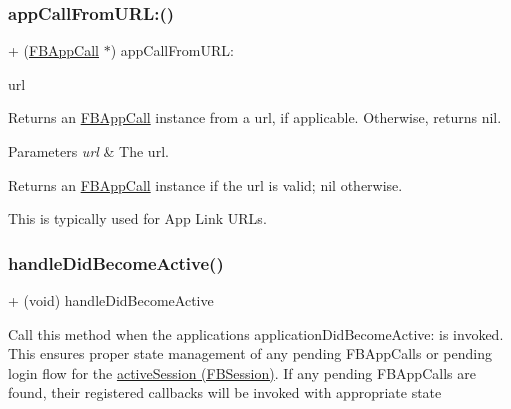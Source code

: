\subsubsection{\texorpdfstring{app\+Call\+From\+U\+R\+L\+:()}{appCallFromURL:()}\hspace{0.1cm}{\footnotesize\ttfamily [5/5]}}
{\footnotesize\ttfamily + (\hyperlink{interfaceFBAppCall}{F\+B\+App\+Call} $\ast$) app\+Call\+From\+U\+R\+L\+: \begin{DoxyParamCaption}\item[{(N\+S\+U\+RL $\ast$)}]{url }\end{DoxyParamCaption}}

Returns an \hyperlink{interfaceFBAppCall}{F\+B\+App\+Call} instance from a url, if applicable. Otherwise, returns nil.


\begin{DoxyParams}{Parameters}
{\em url} & The url.\\
\hline
\end{DoxyParams}
\begin{DoxyReturn}{Returns}
an \hyperlink{interfaceFBAppCall}{F\+B\+App\+Call} instance if the url is valid; nil otherwise.
\end{DoxyReturn}
This is typically used for App Link U\+R\+Ls. \mbox{\label{interfaceFBAppCall_ae38f6595e03e0ba2c44670e7ff579a70}} 
\subsubsection{\texorpdfstring{handle\+Did\+Become\+Active()}{handleDidBecomeActive()}\hspace{0.1cm}{\footnotesize\ttfamily [1/5]}}
{\footnotesize\ttfamily + (void) handle\+Did\+Become\+Active \begin{DoxyParamCaption}{ }\end{DoxyParamCaption}}

Call this method when the application\textquotesingle{}s application\+Did\+Become\+Active\+: is invoked. This ensures proper state management of any pending F\+B\+App\+Calls or pending login flow for the \hyperlink{interfaceFBSession_aaf6863ab39e2f67733792453874d3870}{active\+Session (\+F\+B\+Session)}. If any pending F\+B\+App\+Calls are found, their registered callbacks will be invoked with appropriate state \mbox{\label{interfaceFBAppCall_ae38f6595e03e0ba2c44670e7ff579a70}} 
